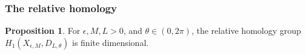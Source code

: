 \documentclass[12pt,reqno]{amsart}
\theoremstyle{definition}
\newtheorem{proposition}[theorem]{Proposition}
\renewcommand{\=}{\;=\;}
\begin{document}
\subsubsection{The relative homology} 
%
%
\begin{proposition}\label{prop:relative-homology} 
For $\epsilon,M,L>0$, and $\theta\in(0,2\pi)$, the relative homology group $H_1(X_{\epsilon,M},D_{L,\theta})$ is finite dimensional. %
\end{proposition}
\end{document}
